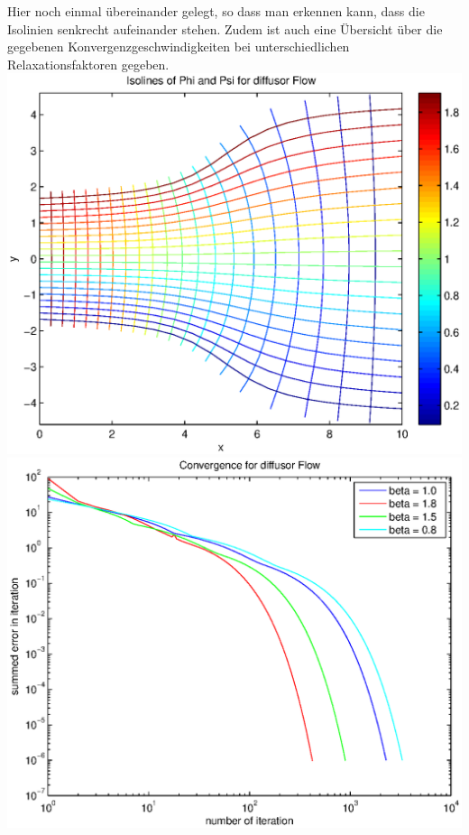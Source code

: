 \documentclass{article}
\begin{document}
Hier noch einmal übereinander gelegt, so dass man erkennen kann, dass die Isolinien senkrecht aufeinander stehen. Zudem
ist auch eine Übersicht über die gegebenen Konvergenzgeschwindigkeiten bei unterschiedlichen Relaxationsfaktoren gegeben.\\
\includegraphics[scale=0.4]{test/3diffusor/both.eps}
\includegraphics[scale=0.4]{test/3diffusor/error.eps}

\newpage
\end{document}
